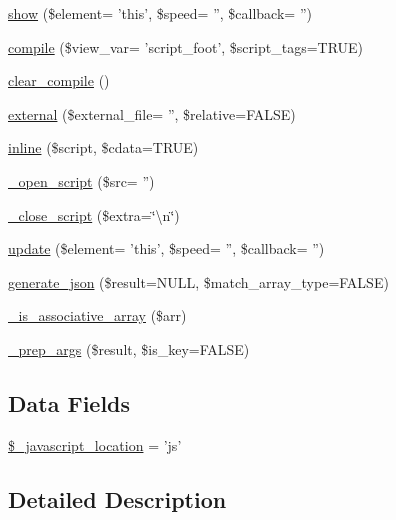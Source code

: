 \begin{DoxyCompactItemize}
\item 
\hyperlink{class_c_i___javascript_aa025222c28ab975bc989225f76d7d9f3}{show} (\$element= 'this', \$speed= '', \$callback= '')
\item 
\hyperlink{class_c_i___javascript_ac903bb7461504041c392c06f23fc27b8}{compile} (\$view\-\_\-var= 'script\-\_\-foot', \$script\-\_\-tags=T\-R\-U\-E)
\item 
\hyperlink{class_c_i___javascript_a4e3a7e7ffc20e8f578a0d66f52def10d}{clear\-\_\-compile} ()
\item 
\hyperlink{class_c_i___javascript_a3466ab14e2cea4f7d82050e789c2b453}{external} (\$external\-\_\-file= '', \$relative=F\-A\-L\-S\-E)
\item 
\hyperlink{class_c_i___javascript_aeecd5d85370a4037c00dba82960816e1}{inline} (\$script, \$cdata=T\-R\-U\-E)
\item 
\hyperlink{class_c_i___javascript_a85bfd18764ef4d0fdbbb3443c89c58ae}{\-\_\-open\-\_\-script} (\$src= '')
\item 
\hyperlink{class_c_i___javascript_a83a39b1edd6e0ec9bd6c93de99a0d4d8}{\-\_\-close\-\_\-script} (\$extra=\char`\"{}\textbackslash{}n\char`\"{})
\item 
\hyperlink{class_c_i___javascript_af6625c6fef0852c0e89db2cef6a21d29}{update} (\$element= 'this', \$speed= '', \$callback= '')
\item 
\hyperlink{class_c_i___javascript_ae60bb50a1e4cbbce1f6c29a73fad5e07}{generate\-\_\-json} (\$result=N\-U\-L\-L, \$match\-\_\-array\-\_\-type=F\-A\-L\-S\-E)
\item 
\hyperlink{class_c_i___javascript_aa37c9b1b7e2898fe21a0deaace09b156}{\-\_\-is\-\_\-associative\-\_\-array} (\$arr)
\item 
\hyperlink{class_c_i___javascript_a10b9bc25e0d84b0dacb1bd7b09f3c0be}{\-\_\-prep\-\_\-args} (\$result, \$is\-\_\-key=F\-A\-L\-S\-E)
\end{DoxyCompactItemize}
\subsection*{Data Fields}
\begin{DoxyCompactItemize}
\item 
\hyperlink{class_c_i___javascript_a1ade0f4214435ac22074136db49cc257}{\$\-\_\-javascript\-\_\-location} = 'js'
\end{DoxyCompactItemize}


\subsection{Detailed Description}


